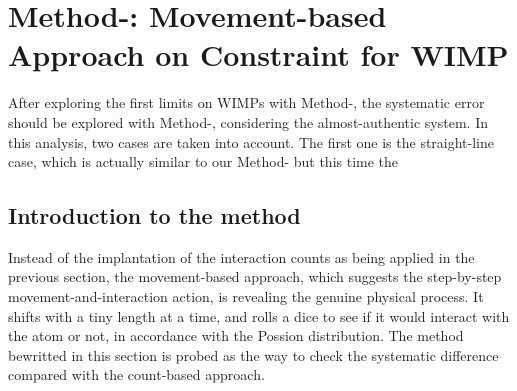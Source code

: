 \chapter{Method-: Movement-based Approach on Constraint for WIMP}
After exploring the first limits on WIMPs with Method-, the systematic error should be explored with Method-, considering the almost-authentic system. In this analysis, two cases are taken into account. The first one is the straight-line case, which is actually similar to our Method- but this time the 

\section{Introduction to the method}

Instead of the implantation of the interaction counts as being applied in the previous section, the movement-based approach, which suggests the step-by-step movement-and-interaction action, is revealing the genuine physical process. It shifts with a tiny length at a time, and rolls a dice to see if it would interact with the atom or not, in accordance with the Possion distribution. The method bewritted in this section is probed as the way to check the systematic difference compared with the count-based approach.\\

